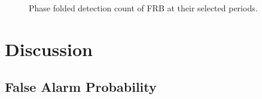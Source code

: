 \documentclass[
  rmp,
  amsmath,
  amssymb,
  preprint]{revtex4-2}
\begin{document}
\begin{figure}
\begin{minipage}[t]{0.33\linewidth}
{{}

}

\end{minipage}%
%
\begin{minipage}[t]{0.33\linewidth}

{\centering 


}

\end{minipage}%

\caption{\label{fig-fold}Phase folded detection count of FRB at their
selected periods.}

\end{figure}

\hypertarget{discussion}{%
\section{Discussion}\label{discussion}}

\hypertarget{false-alarm-probability}{%
\subsection{False Alarm Probability}\label{false-alarm-probability}}
\end{document}
